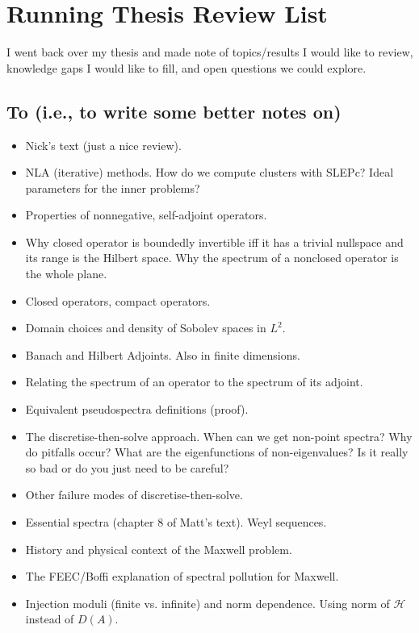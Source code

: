 \documentclass[12pt,a4paper]{article}
\begin{document}
\newpage

\section{Running Thesis Review List}

I went back over my thesis and made note of topics/results I would like to review, knowledge gaps I would like to fill, and open questions we could explore. 

\subsection{To  (i.e., to write some better notes on)}

\begin{itemize}
    \item Nick's text (just a nice review).
    \item NLA (iterative) methods. How do we compute clusters with SLEPc? Ideal parameters for the inner problems?
    \item Properties of nonnegative, self-adjoint operators.
    \item Why closed operator is boundedly invertible iff it has a trivial nullspace and its range is the Hilbert space. Why the spectrum of a nonclosed operator is the whole plane. 
    \item Closed operators, compact operators. 
    \item Domain choices and density of Sobolev spaces in $L^2.$
    \item Banach and Hilbert Adjoints. Also in finite dimensions.
    \item Relating the spectrum of an operator to the spectrum of its adjoint. 
    \item Equivalent pseudospectra definitions (proof). 
    \item The discretise-then-solve approach. When can we get non-point spectra? Why do pitfalls occur? What are the eigenfunctions of non-eigenvalues? Is it really so bad or do you just need to be careful?
    \item Other failure modes of discretise-then-solve.
    \item Essential spectra (chapter 8 of Matt's text). Weyl sequences. 
    \item History and physical context of the Maxwell problem.
    \item The FEEC/Boffi explanation of spectral pollution for Maxwell. 
    \item Injection moduli (finite vs. infinite) and norm dependence. Using norm of $\mathcal{H}$ instead of $D(A).$

\end{itemize}
\end{document}
